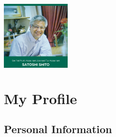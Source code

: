 

\clearpage  %

\vspace*{-15mm}　　 %
\hfill
\begin{minipage}[t]{35mm}
\includegraphics[width=35mm]{shirokanecpa.png}
\end{minipage}

\vspace{-40mm}    %
\section{My Profile}

\subsection{Personal Information}

